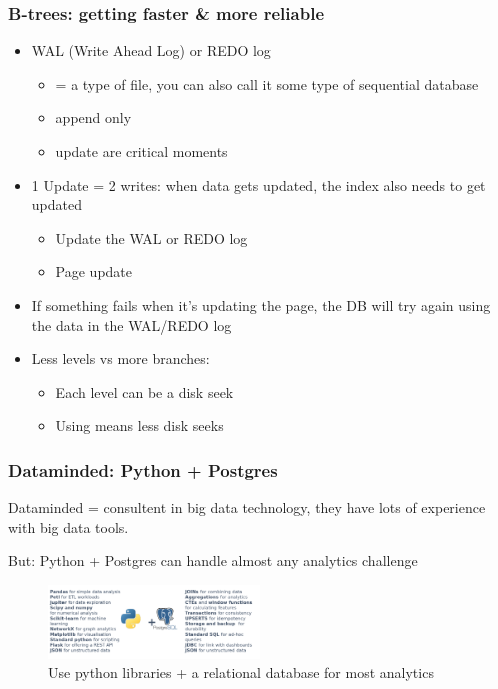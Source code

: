 \documentclass{article}
\begin{document}
\subsubsection{B-trees: getting faster \& more reliable}

\begin{itemize}
    \item WAL (Write Ahead Log) or REDO log
    \begin{itemize}
        \item = a type of file, you can also call it some type of sequential database
        \item append only
        \item update are critical moments
    \end{itemize}
    \item 1 Update = 2 writes: when data gets updated, the index also needs to get updated
    \begin{itemize}
        \item Update the WAL or REDO log
        \item Page update
    \end{itemize}
    \item If something fails when it's updating the page, the DB will try again using the data in the WAL/REDO log
    \item Less levels vs more branches:
    \begin{itemize}
        \item Each level can be a disk seek
        \item Using  means less disk seeks
    \end{itemize}
\end{itemize}


\subsubsection{Dataminded: Python + Postgres}

Dataminded = consultent in big data technology, they have lots of experience with big data tools.

But: Python + Postgres can handle almost any analytics challenge

\begin{figure}[H]
    \centering
    \includegraphics[width=0.5\textwidth]{python-postgres.png}
    \caption{Use python libraries + a relational database for most analytics}
\end{figure}
\end{document}
